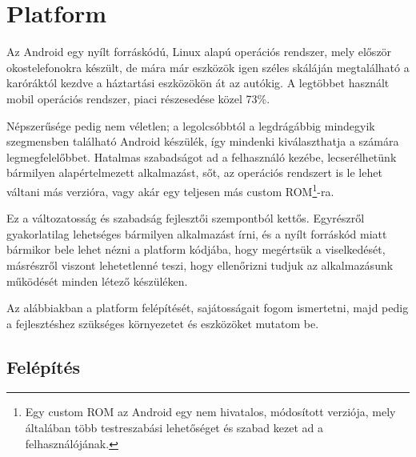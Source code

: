 \chapter{Platform}

Az Android egy nyílt forráskódú, Linux alapú operációs rendszer, mely először okostelefonokra készült, de mára már eszközök igen széles skáláján megtalálható a karóráktól kezdve a háztartási eszközökön át az autókig. A legtöbbet használt mobil operációs rendszer, piaci részesedése közel 73\%.\cite{ShareStat}

Népszerűsége pedig nem véletlen; a legolcsóbbtól a legdrágábbig mindegyik szegmensben található Android készülék, így mindenki kiválaszthatja a számára legmegfelelőbbet. Hatalmas szabadságot ad a felhasználó kezébe, lecserélhetünk bármilyen alapértelmezett alkalmazást, sőt, az operációs rendszert is le lehet váltani más verzióra, vagy akár egy teljesen más custom ROM\footnote{Egy custom ROM az Android egy nem hivatalos, módosított verziója, mely általában több testreszabási lehetőséget és szabad kezet ad a felhasználójának.}-ra.

Ez a változatosság és szabadság fejlesztői szempontból kettős. Egyrészről gyakorlatilag lehetséges bármilyen alkalmazást írni, és a nyílt forráskód miatt bármikor bele lehet nézni a platform kódjába, hogy megértsük a viselkedését, másrészről viszont lehetetlenné teszi, hogy ellenőrizni tudjuk az alkalmazásunk működését minden létező készüléken.

Az alábbiakban a platform felépítését, sajátosságait fogom ismertetni, majd pedig a fejlesztéshez szükséges környezetet és eszközöket mutatom be.

\section{Felépítés}

